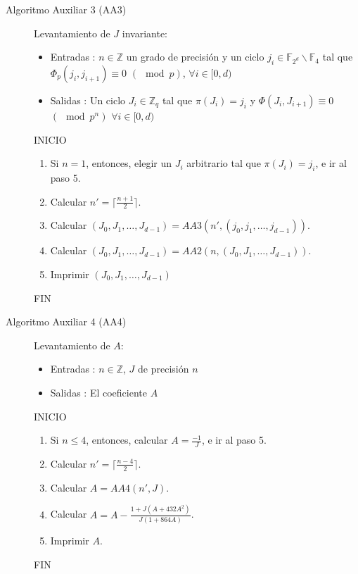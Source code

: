 \documentclass[11pt]{article}
\newcommand{\Z}{\mathbb{Z}}
\newcommand{\F}{\mathbb{F}}
\numberwithin{equation}{section} %
\numberwithin{figure}{section} %
\numberwithin{table}{section} %
\begin{document}
\begin{description}
			\item[Algoritmo Auxiliar 3 (AA3)] Levantamiento de $J$ invariante:%
			\begin{itemize}
				\item Entradas : $n\in\Z$ un grado de precisión y un ciclo $j_{i}\in\F_{2^d}\backslash\F_{4}$ tal que $\Phi_p(j_i,j_{i+1})\equiv 0$ $(\mod p)$, $\forall i\in[0,d)$
				\item Salidas : Un ciclo $J_i\in\Z_q$ tal que $\pi(J_i)=j_i$ y $\Phi(J_i,J_{i+1})\equiv 0$ $(\mod p^n)$ $\forall i\in[0,d)$ 
			\end{itemize}
			INICIO
			\begin{enumerate}
				\item Si $n=1$, entonces, elegir un $J_i$ arbitrario tal que $\pi(J_i)=j_i$, e ir al paso 5.
				\item Calcular $n\prime = \lceil\frac{n+1}{2}\rceil$.
				\item Calcular $(J_0,J_1,\ldots,J_{d-1})=AA3(n\prime,(j_0,j_1,\ldots,j_{d-1}))$.
				\item Calcular $(J_0,J_1,\ldots,J_{d-1})=AA2(n,(J_0,J_1,\ldots,J_{d-1}))$.
				\item Imprimir $(J_0,J_1,\ldots,J_{d-1})$
			\end{enumerate}
			FIN

			\item[Algoritmo Auxiliar 4 (AA4)] Levantamiento de $A$:%
			\begin{itemize}
				\item Entradas : $n\in\Z$, $J$ de precisión $n$
				\item Salidas : El coeficiente $A$ 
			\end{itemize}
			INICIO
			\begin{enumerate}
				\item Si $n\leq 4$, entonces, calcular $A=\frac{-1}{J}$, e ir al paso 5. 
				\item Calcular $n\prime = \lceil\frac{n-4}{2}\rceil$.
				\item Calcular $A=AA4(n\prime,J)$.
				\item Calcular $A=A-\frac{1+J(A+432A^2)}{J(1+864A)}$.
				\item Imprimir $A$. 
			\end{enumerate}
			FIN
	

\end{description}
\end{document}

